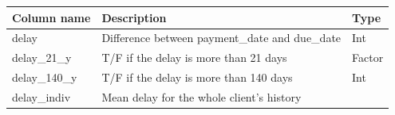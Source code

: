 \documentclass[
]{article}
\begin{document}
\begin{longtable}[]{@{}lll@{}}
\toprule
\begin{minipage}[b]{0.30\columnwidth}\raggedright
Column name\strut
\end{minipage} & \begin{minipage}[b]{0.30\columnwidth}\raggedright
Description\strut
\end{minipage} & \begin{minipage}[b]{0.30\columnwidth}\raggedright
Type\strut
\end{minipage}\tabularnewline
\midrule
\endhead
\begin{minipage}[t]{0.30\columnwidth}\raggedright
delay\strut
\end{minipage} & \begin{minipage}[t]{0.30\columnwidth}\raggedright
Difference between payment\_date and due\_date\strut
\end{minipage} & \begin{minipage}[t]{0.30\columnwidth}\raggedright
Int\strut
\end{minipage}\tabularnewline
\begin{minipage}[t]{0.30\columnwidth}\raggedright
delay\_21\_y\strut
\end{minipage} & \begin{minipage}[t]{0.30\columnwidth}\raggedright
T/F if the delay is more than 21 days\strut
\end{minipage} & \begin{minipage}[t]{0.30\columnwidth}\raggedright
Factor\strut
\end{minipage}\tabularnewline
\begin{minipage}[t]{0.30\columnwidth}\raggedright
delay\_140\_y\strut
\end{minipage} & \begin{minipage}[t]{0.30\columnwidth}\raggedright
T/F if the delay is more than 140 days\strut
\end{minipage} & \begin{minipage}[t]{0.30\columnwidth}\raggedright
Int\strut
\end{minipage}\tabularnewline
\begin{minipage}[t]{0.30\columnwidth}\raggedright
delay\_indiv\strut
\end{minipage} & \begin{minipage}[t]{0.30\columnwidth}\raggedright
Mean delay for the whole client's history\strut
\end{minipage} & \begin{minipage}[t]{0.30\columnwidth}\raggedright

\end{minipage}
\end{longtable}
\end{document}
